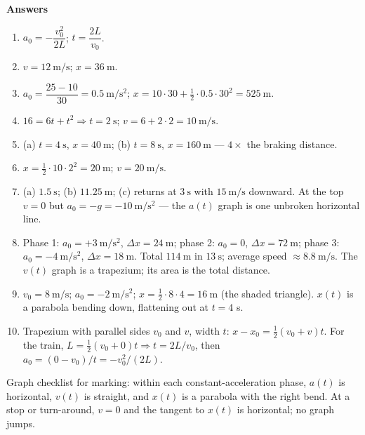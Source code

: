 \documentclass[11pt,a4paper]{article}
\newcommand{\nsec}[1]{\vspace{9pt}\par{\color{accent}\large\bfseries #1}\par\vspace{2pt}}
\newcommand{\ms}{\ \mathrm{m/s}}
\newcommand{\mss}{\ \mathrm{m/s^2}}
\begin{document}
\ifdefined\isdad
\clearpage
\par\noindent\begin{minipage}{\linewidth}
\nsec{Answers}
{\small
\begin{enumerate}[label=\textbf{\arabic*.}, leftmargin=1.7em, itemsep=1pt, topsep=1pt, start=0]
  \item $a_0 = -\dfrac{v_0^{2}}{2L}$; \; $t = \dfrac{2L}{v_0}$.
  \item $v = 12\ms$; \; $x = 36\ \mathrm{m}$.
  \item $a_0 = \dfrac{25-10}{30} = 0.5\mss$; \;
        $x = 10\cdot30 + \tfrac{1}{2}\cdot0.5\cdot30^2 = 525\ \mathrm{m}$.
  \item $16 = 6t + t^2 \Rightarrow t = 2\ \mathrm{s}$; \;
        $v = 6 + 2\cdot2 = 10\ms$.
  \item (a) $t = 4\ \mathrm{s}$, $x = 40\ \mathrm{m}$; \;(b) $t = 8\ \mathrm{s}$,
        $x = 160\ \mathrm{m}$ --- $4\times$ the braking distance.
  \item $x = \tfrac{1}{2}\cdot 10\cdot 2^{2} = 20\ \mathrm{m}$; \; $v = 20\ms$.
  \item (a) $1.5\ \mathrm{s}$; \;(b) $11.25\ \mathrm{m}$; \;(c) returns at $3\ \mathrm{s}$
        with $15\ms$ downward. At the top $v = 0$ but $a_0 = -g = -10\mss$ --- the $a(t)$
        graph is one unbroken horizontal line.
  \item Phase 1: $a_0 = +3\mss$, $\Delta x = 24\ \mathrm{m}$; \;
        phase 2: $a_0 = 0$, $\Delta x = 72\ \mathrm{m}$; \;
        phase 3: $a_0 = -4\mss$, $\Delta x = 18\ \mathrm{m}$. Total $114\ \mathrm{m}$ in $13\ \mathrm{s}$;
        average speed $\approx 8.8\ms$. The $v(t)$ graph is a trapezium; its area is the
        total distance.
  \item $v_0 = 8\ms$; \; $a_0 = -2\mss$; \; $x = \tfrac{1}{2}\cdot 8 \cdot 4 = 16\ \mathrm{m}$
        (the shaded triangle). $x(t)$ is a parabola bending down, flattening out at $t=4$ s.
  \item Trapezium with parallel sides $v_0$ and $v$, width $t$:
        $x-x_0 = \tfrac{1}{2}(v_0+v)t$. For the train,
        $L = \tfrac{1}{2}(v_0+0)t \Rightarrow t = 2L/v_0$, then
        $a_0 = (0-v_0)/t = -v_0^{2}/(2L)$.
\end{enumerate}
\textcolor{muted}{Graph checklist for marking: within each constant-acceleration phase,
$a(t)$ is horizontal, $v(t)$ is straight, and $x(t)$ is a parabola with the right bend.
At a stop or turn-around, $v=0$ and the tangent to $x(t)$ is horizontal; no graph jumps.}}
\end{minipage}
\end{document}
